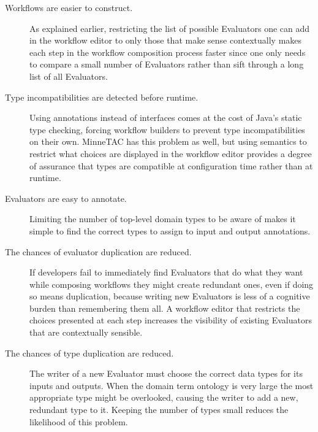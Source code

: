 \documentclass{article}
\begin{document}
\begin{description}

\item[Workflows are easier to construct.]
As explained earlier, restricting the list of possible Evaluators one can add in the workflow editor to only those that make sense contextually makes each step in the workflow composition process faster since one only needs to compare a small number of Evaluators rather than sift through a long list of all Evaluators.

\item[Type incompatibilities are detected before runtime.]
Using annotations instead of interfaces comes at the cost of Java's static type checking, forcing workflow builders to prevent type incompatibilities on their own.
MinneTAC has this problem as well, but using semantics to restrict what choices are displayed in the workflow editor provides a degree of assurance that types are compatible at configuration time rather than at runtime.

\item[Evaluators are easy to annotate.]
Limiting the number of top-level domain types to be aware of makes it simple to find the correct types to assign to input and output annotations.

\item[The chances of evaluator duplication are reduced.]
If developers fail to immediately find Evaluators that do what they want while composing workflows they might create redundant ones, even if doing so means duplication, because writing new Evaluators is less of a cognitive burden than remembering them all.
A workflow editor that restricts the choices presented at each step increases the visibility of existing Evaluators that are contextually sensible.

\item[The chances of type duplication are reduced.]
The writer of a new Evaluator must choose the correct data types for its inputs and outputs.
When the domain term ontology is very large the most appropriate type might be overlooked, causing the writer to add a new, redundant type to it.
Keeping the number of types small reduces the likelihood of this problem.

\end{description}
\end{document}

